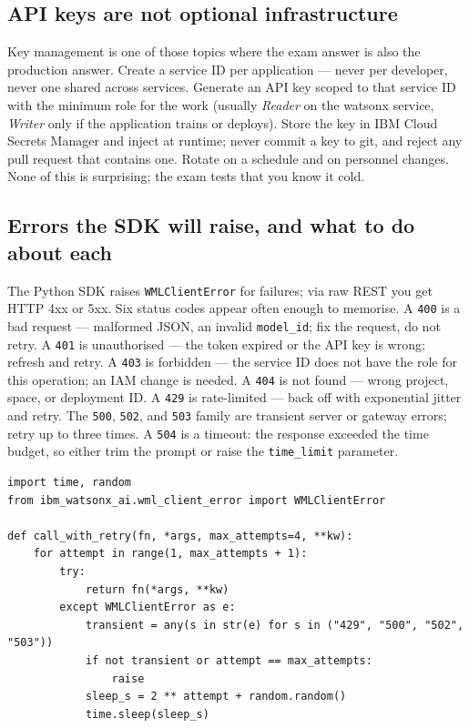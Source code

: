 \subsection{API keys are not optional infrastructure}

Key management is one of those topics where the exam answer is also the production answer. Create a service ID per application --- never per developer, never one shared across services. Generate an API key scoped to that service ID with the minimum role for the work (usually \emph{Reader} on the watsonx service, \emph{Writer} only if the application trains or deploys). Store the key in IBM Cloud Secrets Manager and inject at runtime; never commit a key to git, and reject any pull request that contains one. Rotate on a schedule and on personnel changes. None of this is surprising; the exam tests that you know it cold.

\subsection{Errors the SDK will raise, and what to do about each}

The Python SDK raises \texttt{WMLClientError} for failures; via raw REST you get HTTP 4xx or 5xx. Six status codes appear often enough to memorise. A \texttt{400} is a bad request --- malformed JSON, an invalid \texttt{model\_id}; fix the request, do not retry. A \texttt{401} is unauthorised --- the token expired or the API key is wrong; refresh and retry. A \texttt{403} is forbidden --- the service ID does not have the role for this operation; an IAM change is needed. A \texttt{404} is not found --- wrong project, space, or deployment ID. A \texttt{429} is rate-limited --- back off with exponential jitter and retry. The \texttt{500}, \texttt{502}, and \texttt{503} family are transient server or gateway errors; retry up to three times. A \texttt{504} is a timeout: the response exceeded the time budget, so either trim the prompt or raise the \texttt{time\_limit} parameter.

\begin{examplebox}[title=\textbf{Retry-with-backoff helper}]
\begin{lstlisting}[style=pythonstyle]
import time, random
from ibm_watsonx_ai.wml_client_error import WMLClientError

def call_with_retry(fn, *args, max_attempts=4, **kw):
    for attempt in range(1, max_attempts + 1):
        try:
            return fn(*args, **kw)
        except WMLClientError as e:
            transient = any(s in str(e) for s in ("429", "500", "502", "503"))
            if not transient or attempt == max_attempts:
                raise
            sleep_s = 2 ** attempt + random.random()
            time.sleep(sleep_s)
\end{lstlisting}
\end{examplebox}

